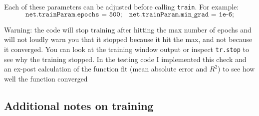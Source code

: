 \documentclass[a4paper,12pt]{article}
\newcommand{\code}[1]{\texttt{#1}}
\begin{document}
Each of these parameters can be adjusted before calling \code{train}. For example:
\[
\code{net.trainParam.epochs = 500;} \quad
\code{net.trainParam.min\_grad = 1e{-6};}
\]

Warning: the code will stop training after hitting the max number of epochs and will not loudly warn you that it stopped because it hit the max, and not because it converged. You can look at the training window output or inspect \code{tr.stop} to see why the training stopped. In the testing code I implemented this check and an ex-post calculation of the function fit (mean absolute error and $R^2$) to see how well the function converged



\subsection{Additional notes on training}
\end{document}
